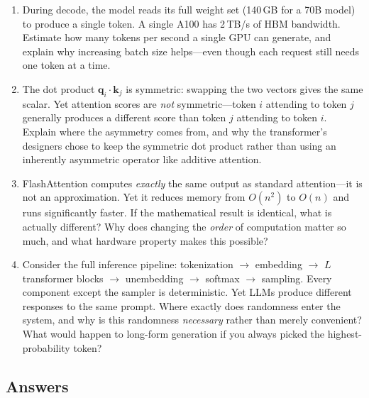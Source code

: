 \begin{enumerate}
    \item During decode, the model reads its full weight set (140\,GB for a 70B model) to produce a single token. A single A100 has 2\,TB/s of HBM bandwidth. Estimate how many tokens per second a single GPU can generate, and explain why increasing batch size helps---even though each request still needs one token at a time.

    \item The dot product $\mathbf{q}_i \cdot \mathbf{k}_j$ is symmetric: swapping the two vectors gives the same scalar. Yet attention scores are \emph{not} symmetric---token $i$ attending to token $j$ generally produces a different score than token $j$ attending to token $i$. Explain where the asymmetry comes from, and why the transformer's designers chose to keep the symmetric dot product rather than using an inherently asymmetric operator like additive attention.

    \item FlashAttention computes \emph{exactly} the same output as standard attention---it is not an approximation. Yet it reduces memory from $O(n^2)$ to $O(n)$ and runs significantly faster. If the mathematical result is identical, what is actually different? Why does changing the \emph{order} of computation matter so much, and what hardware property makes this possible?

    \item Consider the full inference pipeline: tokenization $\to$ embedding $\to$ $L$ transformer blocks $\to$ unembedding $\to$ softmax $\to$ sampling. Every component except the sampler is deterministic. Yet LLMs produce different responses to the same prompt. Where exactly does randomness enter the system, and why is this randomness \emph{necessary} rather than merely convenient? What would happen to long-form generation if you always picked the highest-probability token?
\end{enumerate}

\subsection*{Answers}

